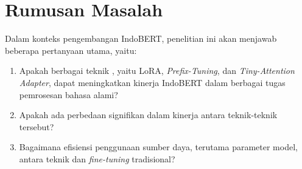 \section{Rumusan Masalah}

Dalam konteks pengembangan IndoBERT, penelitian ini akan menjawab beberapa pertanyaan utama, yaitu:

\begin{enumerate}
    \item Apakah berbagai teknik \PETL, yaitu LoRA, \textit{Prefix-Tuning}, dan \textit{Tiny-Attention Adapter}, dapat meningkatkan kinerja IndoBERT dalam berbagai tugas pemrosesan bahasa alami?
    \item Apakah ada perbedaan signifikan dalam kinerja antara teknik-teknik \PETL tersebut?
    \item Bagaimana efisiensi penggunaan sumber daya, terutama parameter model, antara teknik \PETL dan \textit{fine-tuning} tradisional?
\end{enumerate}